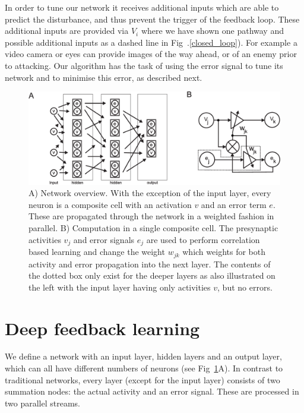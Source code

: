 \documentclass{article}
\begin{document}
In order to tune our network it receives additional inputs which are
able to predict the disturbance, and thus prevent the trigger of the
feedback loop. These additional inputs are provided via $V_i$ where we
have shown one pathway and possible additional inputs as a dashed line
in Fig~.\ref{closed_loop}). For example a video camera or eyes can
provide images of the way ahead, or of an enemy prior to
attacking. Our algorithm has the task of using the error signal to
tune its network and to minimise this error, as described next.

\begin{figure}[!ht]
  \centering
  \includegraphics[width=\columnwidth]{netw_together}
  \caption{A) Network overview. With the exception of the input layer, every
    neuron is a composite cell with an activation $v$ and an error
    term $e$. These are propagated through the network in a weighted
    fashion in parallel.  B) Computation in a single composite cell.
    The presynaptic activities $v_j$ and error signals $e_j$ are used
    to perform correlation based learning and change the weight
    $w_{jk}$ which weights for both activity and error propagation into the next
    layer. The contents of the dotted box only exist for the deeper
    layers as also illustrated on the left with the input layer
    having only activities $v$, but no errors. \label{netw_together}}
\end{figure}


\section{Deep feedback learning}
We define a network with an input layer, hidden layers and an output
layer, which can all have different numbers of neurons (see
Fig~\ref{netw_together}A). In contrast to traditional
networks, every layer (except for the input layer) consists of two
summation nodes: the actual activity and an error signal. These
are processed in two parallel streams.
\end{document}
